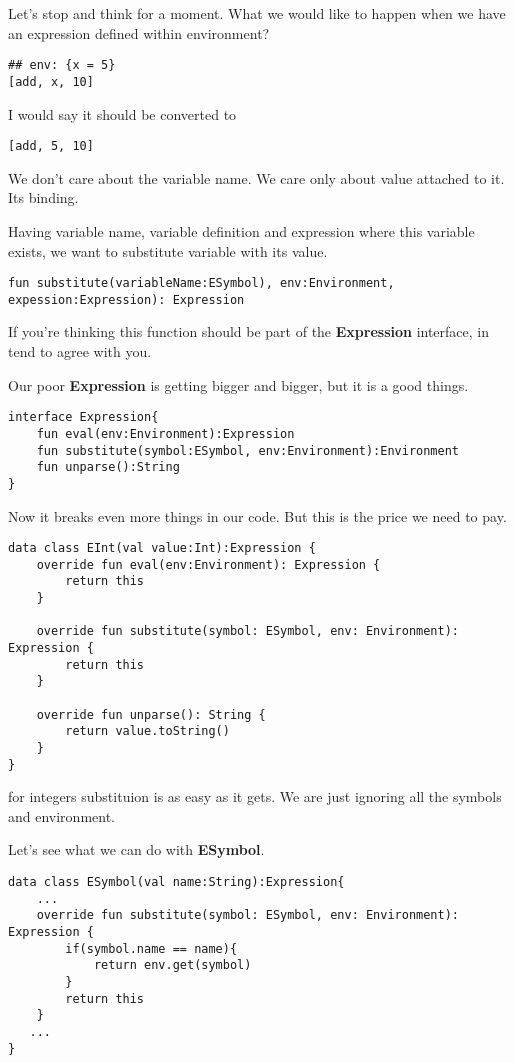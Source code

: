 \documentclass[11pt]{article}
\begin{document}
Let's stop and think for a moment.
What we would like to happen when we have an expression defined within environment?
\begin{verbatim}
## env: {x = 5}
[add, x, 10]
\end{verbatim}

I would say it should be converted to
\begin{verbatim}
[add, 5, 10]
\end{verbatim}
We don't care about the variable name. We care only about value attached to it. Its binding.

Having variable name, variable definition and expression where this variable exists, we want to substitute variable with its value.

\begin{verbatim}
fun substitute(variableName:ESymbol), env:Environment, expession:Expression): Expression
\end{verbatim}

If you're thinking this function should be part of the \textbf{Expression} interface, in tend to agree with you.

Our poor \textbf{Expression} is getting bigger and bigger, but it is a good things.

\begin{verbatim}
interface Expression{
    fun eval(env:Environment):Expression
    fun substitute(symbol:ESymbol, env:Environment):Environment
    fun unparse():String
}
\end{verbatim}

Now it breaks even more things in our code. But this is the price we need to pay.

\begin{verbatim}
data class EInt(val value:Int):Expression {
    override fun eval(env:Environment): Expression {
        return this
    }

    override fun substitute(symbol: ESymbol, env: Environment): Expression {
        return this
    }

    override fun unparse(): String {
        return value.toString()
    }
}
\end{verbatim}

for integers substituion is as easy as it gets.
We are just ignoring all the symbols and environment.

Let's see what we can do with \textbf{ESymbol}.
\begin{verbatim}
data class ESymbol(val name:String):Expression{
    ...
    override fun substitute(symbol: ESymbol, env: Environment): Expression {
        if(symbol.name == name){
            return env.get(symbol)
        }
        return this
    }
   ...
}
\end{verbatim}
\end{document}
